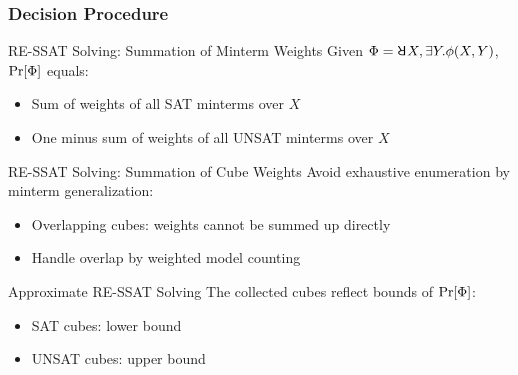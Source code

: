 \begin{frame}
  \frametitle{Decision Procedure}
  \begin{block}{RE-SSAT Solving: Summation of Minterm Weights}
    Given $\Qf=\random{} X,\exists Y.\pf(X,Y)$, $\Pr[\Phi]$ equals:
    \pause
    \begin{itemize}
      \item Sum of weights of all SAT minterms over $X$
            \pause
      \item One minus sum of weights of all UNSAT minterms over $X$
            \pause
    \end{itemize}
  \end{block}
  \begin{block}{RE-SSAT Solving: Summation of Cube Weights}
    Avoid exhaustive enumeration by minterm generalization:
    \pause
    \begin{itemize}
      \item Overlapping cubes: weights cannot be summed up directly
            \pause
      \item Handle overlap by weighted model counting
            \pause
    \end{itemize}
  \end{block}
  \begin{block}{Approximate RE-SSAT Solving}
    The collected cubes reflect bounds of $\Pr[\Phi]$:
    \pause
    \begin{itemize}
      \item SAT cubes: lower bound
            \pause
      \item UNSAT cubes: upper bound
    \end{itemize}
  \end{block}
\end{frame}

